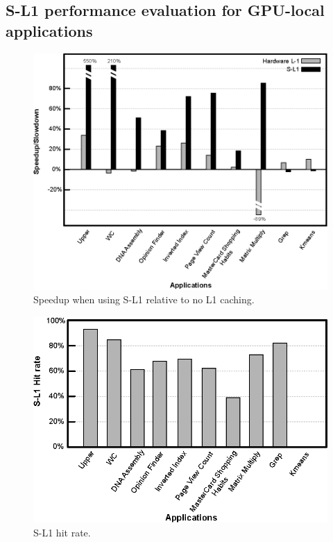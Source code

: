 \subsection{S-L1 performance evaluation for GPU-local applications}
\label{sec:perfevaluation}

\begin{figure}[t]
\center
\includegraphics[scale=0.7]{1speedups.eps}
\vspace{-0.6cm}
\caption{\footnotesize\textnormal{Speedup when using S-L1 relative to no L1 caching.}}
\label{fig:perfbenefit}
\vspace{-0.2cm}
\end{figure}
\vspace{-0.0cm}

\begin{figure}[t]
\center
\includegraphics[scale=0.9]{3memoryAcceessReuction.eps}
\vspace{-0.7cm}
\caption{\footnotesize\textnormal{S-L1 hit rate.}}
\label{fig:sl1hitrate}
\vspace{-0.3cm}
\end{figure}


